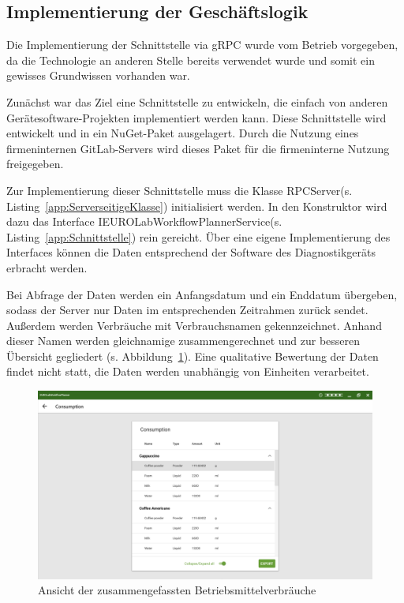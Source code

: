 \subsection{Implementierung der Geschäftslogik}
\label{sec:ImplementierungDerGeschäftslogik}
Die Implementierung der Schnittstelle via {\acs{gRPC}} wurde vom Betrieb vorgegeben, da die Technologie an anderen Stelle bereits verwendet wurde und somit ein gewisses Grundwissen vorhanden war.

Zunächst war das Ziel eine Schnittstelle zu entwickeln, die einfach von anderen Gerätesoftware-Projekten implementiert werden kann. Diese Schnittstelle wird entwickelt und in ein {\acs{NuGet}}-Paket ausgelagert. Durch die Nutzung eines firmeninternen {\acs{GitLab}}-Servers wird dieses Paket für die firmeninterne Nutzung freigegeben.

Zur Implementierung dieser Schnittstelle muss die Klasse \glqq RPCServer\grqq \space (s. Listing~\ref{app:ServerseitigeKlasse}) initialisiert werden. In den Konstruktor wird dazu das Interface \glqq IEUROLabWorkflowPlannerService\grqq \space (s. Listing~\ref{app:Schnittstelle}) rein gereicht. Über eine eigene Implementierung des Interfaces können die Daten entsprechend der Software des Diagnostikgeräts erbracht werden.

Bei Abfrage der Daten werden ein Anfangsdatum und ein Enddatum übergeben, sodass der Server nur Daten im entsprechenden Zeitrahmen zurück sendet. Außerdem werden Verbräuche mit Verbrauchsnamen gekennzeichnet. Anhand dieser Namen werden gleichnamige zusammengerechnet und zur besseren Übersicht gegliedert (s. Abbildung~\ref{fig:Consumptions}). Eine qualitative Bewertung der Daten findet nicht statt, die Daten werden unabhängig von Einheiten verarbeitet.

\begin{figure}[htb]
	\centering
	\includegraphics[scale=0.5]{Bilder/VerbrauchAnsicht.png}
	\caption{Ansicht der zusammengefassten Betriebsmittelverbräuche}
	\label{fig:Consumptions}
\end{figure}